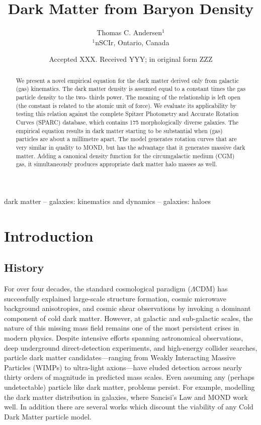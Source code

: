 \documentclass[fleqn,usenatbib]{mnras}
\title[A One to One Mapping of Baryons to Dark Matter]{Dark Matter from Baryon Density}
\author[T. C. Andersen]{Thomas C. Andersen$^{1}$\\
$^{1}$nSCIr, Ontario, Canada}
\date{Accepted XXX. Received YYY; in original form ZZZ}
\begin{document}
\label{firstpage}
\pagerange{\pageref{firstpage}--\pageref{lastpage}}
\maketitle

\begin{abstract}
We present a novel empirical equation for the dark matter derived only from galactic (gas) kinematics. The dark matter density is assumed equal to a constant times the gas particle density to the two-	thirds power. The meaning of the relationship is left open (the constant is  related to the atomic unit of force). We evaluate its applicability by  testing this relation against the complete Spitzer Photometry and Accurate Rotation Curves (SPARC) database, which contains 175 morphologically diverse galaxies. The empirical equation results in dark matter starting to be substantial when (gas) particles are about a millimetre apart. The model generates rotation curves that are very similar in quality to MOND, but has the advantage that it generates massive dark matter. Adding a canonical density function for the circumgalactic medium (CGM) gas, it simultaneously produces appropriate dark matter halo masses as well.
\end{abstract}

\begin{keywords}
dark matter -- galaxies: kinematics and dynamics -- galaxies: haloes
\end{keywords}

\section{Introduction} \label{sec:intro}

\subsection{History} \label{subsec:history}

For over four decades, the standard cosmological paradigm ($\Lambda$CDM) has successfully explained large-scale structure formation, cosmic microwave background anisotropies, and cosmic shear observations by invoking a dominant component of cold dark matter. However, at galactic and sub-galactic scales, the nature of this missing mass field remains one of the most persistent crises in modern physics. Despite intensive efforts spanning astronomical observations, deep underground direct-detection experiments, and high-energy collider searches, particle dark matter candidates---ranging from Weakly Interacting Massive Particles (WIMPs) to ultra-light axions---have eluded detection across nearly thirty orders of magnitude in predicted mass scales. Even assuming any (perhaps undetectable) particle like dark matter, problems persist. For example, modelling the dark matter distribution in galaxies, where Sancisi's Law\citep{sancisiVisibleMatterDark2004} and MOND  \citep{lelliSPARCMassModels2016, Lelli2017} work well. In addition there are several works which discount the viability of any Cold Dark Matter particle model\citep{kroupaManyTensionsDarkmatter2023, famaeyChallengesLCDMMOND2013}.  
\end{document}
